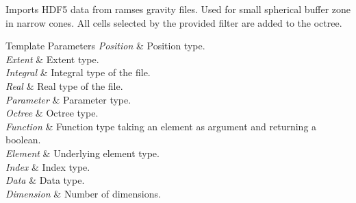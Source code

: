 Imports H\-D\-F5 data from ramses gravity files. Used for small spherical buffer zone in narrow cones. All cells selected by the provided filter are added to the octree. 
\begin{DoxyTemplParams}{Template Parameters}
{\em Position} & Position type. \\
\hline
{\em Extent} & Extent type. \\
\hline
{\em Integral} & Integral type of the file. \\
\hline
{\em Real} & Real type of the file. \\
\hline
{\em Parameter} & Parameter type. \\
\hline
{\em Octree} & Octree type. \\
\hline
{\em Function} & Function type taking an element as argument and returning a boolean. \\
\hline
{\em Element} & Underlying element type. \\
\hline
{\em Index} & Index type. \\
\hline
{\em Data} & Data type. \\
\hline
{\em Dimension} & Number of dimensions. \\
\hline
\end{DoxyTemplParams}

